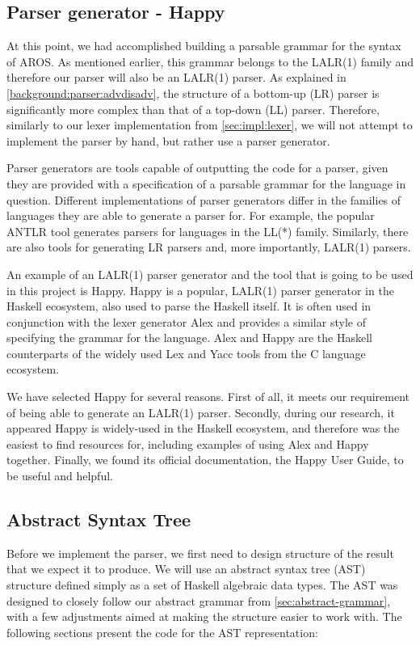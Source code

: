 \subsection{Parser generator - Happy}
At this point, we had accomplished building a parsable grammar for the syntax of AROS. As mentioned earlier, this grammar belongs to the LALR(1) family and therefore our parser will also be an LALR(1) parser. As explained in \cref{background:parser:advdisadv}, the structure of a bottom-up (LR) parser is significantly more complex than that of a top-down (LL) parser. Therefore, similarly to our lexer implementation from \cref{sec:impl:lexer}, we will not attempt to implement the parser by hand, but rather use a parser generator.
\par Parser generators are tools capable of outputting the code for a parser, given they are provided with a specification of a parsable grammar for the language in question. Different implementations of parser generators differ in the families of languages they are able to generate a parser for. For example, the popular ANTLR tool generates parsers for languages in the LL(*) family.\cite{antlr-github} Similarly, there are also tools for generating LR parsers and, more importantly, LALR(1) parsers. 
\par An example of an LALR(1) parser generator and the tool that is going to be used in this project is Happy. Happy is a popular, LALR(1) parser generator in the Haskell ecosystem, also used to parse the Haskell itself. It is often used in conjunction with the lexer generator Alex and provides a similar style of specifying the grammar for the language. Alex and Happy are the Haskell counterparts of the widely used Lex and Yacc tools from the C language ecosystem. \cite{happyUserGuide}
\par We have selected Happy for several reasons. First of all, it meets our requirement of being able to generate an LALR(1) parser. Secondly, during our research, it appeared Happy is widely-used in the Haskell ecosystem, and therefore was the easiest to find resources for, including examples of using Alex and Happy together. Finally, we found its official documentation, the Happy User Guide, to be useful and helpful. \cite{happyUserGuide} 

\subsection{Abstract Syntax Tree}
\label{sec:parser:ast}
Before we implement the parser, we first need to design structure of the result that we expect it to produce. We will use an abstract syntax tree (AST) structure defined simply as a set of Haskell algebraic data types. The AST was designed to closely follow our abstract grammar from \cref{sec:abstract-grammar}, with a few adjustments aimed at making the structure easier to work with. The following sections present the code for the AST representation:
